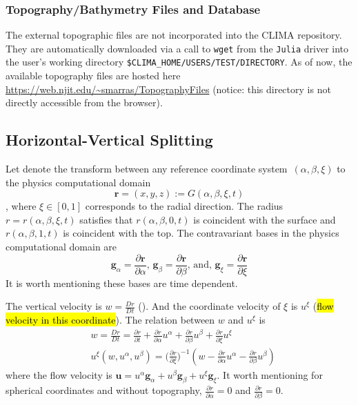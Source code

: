 \documentclass{report}
\numberwithin{equation}{section}
\begin{document}

\subsubsection{Topography/Bathymetry Files and Database}
The external topographic files are not incorporated into the CLIMA repository. 
They are automatically downloaded via a call to {\tt wget} from the {\tt Julia} driver into the user's working directory {\tt \$CLIMA\_HOME/USERS/TEST/DIRECTORY}. As of now, the available topography files are hosted here \url{https://web.njit.edu/~smarras/TopographyFiles} (notice: this directory is not directly accessible from the browser).

\subsection{Horizontal-Vertical Splitting}
Let denote the transform between any reference coordinate system~$(\alpha, \beta, \xi)$ to the physics computational domain
$$\bm{r} = (x, y, z) := G(\alpha, \beta, \xi, t) $$
, where $\xi \in [0,1]$ corresponds to the radial direction. The radius $r=r(\alpha,\beta,\xi, t)$ satisfies that $r(\alpha, \beta, 0, t)$ is coincident with the surface and $r(\alpha, \beta, 1, t)$ is coincident with the top. 
The contravariant bases in the physics computational domain are 
$$\bm{g}_{\alpha} = \frac{\partial \bm{r}}{\partial \alpha},\,\bm{g}_{\beta} = \frac{\partial \bm{r}}{\partial \beta},\,\textrm{and},\,\bm{g}_{\xi} = \frac{\partial \bm{r}}{\partial \xi}$$
It is worth mentioning these bases are time dependent.

The vertical velocity is $w = \frac{Dr}{Dt}$ (). And the coordinate velocity of $\xi$ is $u^{\xi}$ (\hl{flow velocity in this coordinate}).
The relation between $w$ and $u^{\xi}$ is
\begin{align*}
    &w = \frac{Dr}{Dt} = \frac{\partial r}{\partial t} + \frac{\partial r}{\partial \alpha} u^{\alpha} +  \frac{\partial r}{\partial \beta} u^{\beta} + \frac{\partial r}{\partial \xi} u^{\xi} \\
    &u^{\xi}(w, u^{\alpha}, u^{\beta}) = \Big(\frac{\partial r}{\partial \xi}\Big)^{-1}(w - \frac{\partial r}{\partial \alpha} u^{\alpha} -  \frac{\partial r}{\partial \beta} u^{\beta}  )
\end{align*}
where the flow velocity is $\bm{u} = u^{\alpha}\bm{g}_{\alpha} + u^{\beta}\bm{g}_{\beta} + u^{\xi}\bm{g}_{\xi}$. It worth mentioning for spherical coordinates and without topography, $\frac{\partial r}{\partial \alpha} = 0 $ and $\frac{\partial r}{\partial \beta} = 0$.
\end{document}
